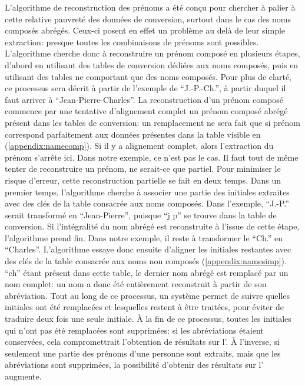 L'algorithme de reconstruction des prénoms a été conçu pour chercher à palier à cette relative pauvreté des données de conversion, surtout dans le cas des noms composés abrégés. Ceux-ci posent en effet un problème au delà de leur simple extraction: presque toutes les combinaisons de prénoms sont possibles. L'algorithme cherche donc à reconstruire un prénom composé en plusieurs étapes, d'abord en utilisant des tables de conversion dédiées aux noms composés, puis en utilisant des tables ne comportant que des noms composés. Pour plus de clarté, ce processus sera décrit à partir de l'exemple de \enquote{J.-P.-Ch.}, à partir duquel il faut arriver à \enquote{Jean-Pierre-Charles}. La reconstruction d'un prénom composé commence par une tentative d'alignement complet un prénom composé abrégé présent dans les tables de conversion: un remplacement ne sera fait que si prénom correspond parfaitement aux données présentes dans la table visible en (\ref{appendix:namecomp}). Si il y a alignement complet, alors l'extraction du prénom s'arrête ici. Dans notre exemple, ce n'est pas le cas. Il faut tout de même tenter de reconstruire un prénom, ne serait-ce que partiel. Pour minimiser le risque d'erreur, cette reconstruction partielle se fait en deux temps. Dans un premier temps, l'algorithme cherche à associer une partie des initiales extraites avec des clés de la table consacrée aux noms composés. Dans l'exemple, \enquote{J.-P.} serait transformé en \enquote{Jean-Pierre}, puisque \enquote{j p} se trouve dans la table de conversion. Si l'intégralité du nom abrégé est reconstruite à l'issue de cette étape, l'algorithme prend fin. Dans notre exemple, il reste à transformer le \enquote{Ch.} en \enquote{Charles}. L'algorithme essaye donc ensuite d'aligner les initiales restantes avec des clés de la table consacrée aux noms non composés (\ref{appendix:namesimp}). \enquote{ch} étant présent dans cette table, le dernier nom abrégé est remplacé par un nom complet: un nom a donc été entièrement reconstruit à partir de son abréviation. Tout au long de ce processus, un système permet de suivre quelles initiales ont été remplacées et lesquelles restent à être traitées, pour éviter de traduire deux fois une seule initiale. À la fin de ce processus, toutes les initiales qui n'ont pas été remplacées sont supprimées: si les abréviations étaient conservées, cela compromettrait l'obtention de résultats sur l'\api{}. À l'inverse, si seulement une partie des prénoms d'une personne sont extraits, mais que les abréviations sont supprimées, la possibilité d'obtenir des résultats sur l'\api{} augmente.

